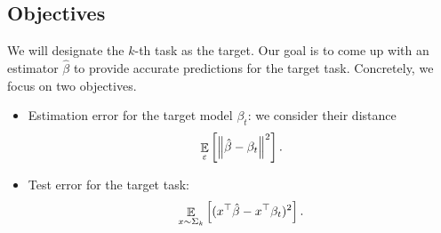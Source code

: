 \subsection{Objectives}

We will designate the $k$-th task as the target.
Our goal is to come up with an estimator $\hat{\beta}$ to provide accurate predictions for the target task.
Concretely, we focus on two objectives.
\begin{itemize}
	\item Estimation error for the target model $\beta_t$: we consider their distance
		\[ \mathop{\mathbb{E}}_{\varepsilon}\left[ \left\| \hat{\beta} - \beta_t \right\|^2 \right]. \]
	\item Test error for the target task:
		\[ \mathop{\mathbb{E}}_{x \sim \Sigma_k}\left[ (x^{\top}\hat{\beta} - x^{\top}\beta_t)^2 \right]. \]
\end{itemize}

